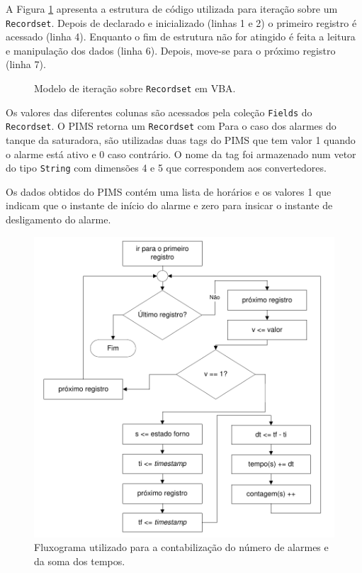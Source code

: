 \begin{multicols}{2}
	A Figura \ref{fig:iterat} apresenta a estrutura de código utilizada para iteração sobre um \texttt{Recordset}. Depois de declarado e inicializado (linhas 1 e 2) o primeiro registro é acessado (linha 4). Enquanto o fim de estrutura não for atingido é feita a leitura e manipulação dos dados (linha 6). Depois, move-se para o próximo registro (linha 7).
	\begin{figure}[H]
		\centering
		
		\caption{Modelo de iteração sobre \texttt{Recordset} em VBA.}
		\label{fig:iterat}
	\end{figure}			
	Os valores das diferentes colunas são acessados pela coleção \texttt{Fields} do \texttt{Recordset}. O PIMS retorna um \texttt{Recordset} com 
	Para o caso dos alarmes do tanque da saturadora, são utilizadas duas tags do PIMS que tem valor 1 quando o alarme está ativo e 0 caso contrário. O nome da tag foi armazenado num vetor do tipo \texttt{String} com dimensões 4 e 5 que correspondem aos convertedores.
	
	Os dados obtidos do PIMS contém uma lista de horários e os valores 1 que indicam que o instante de início do alarme e zero para insicar o instante de desligamento do alarme.
	\begin{figure}[H]
		\centering
		\includegraphics[scale=0.55, bb=0 0 432 432, trim=0in 0in 0in 0in]{figures/flux.pdf} %
		\caption{Fluxograma utilizado para a contabilização do número de alarmes e da soma dos tempos.}
		\label{fig:alg}
	\end{figure}		
	
	

% 
% 
\renewcommand{\bibname}{Referências}


\end{multicols}	